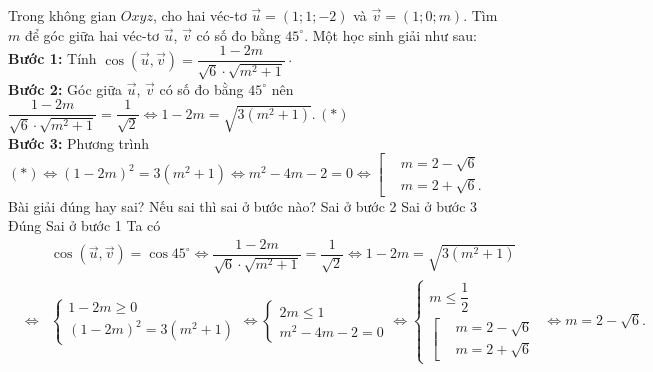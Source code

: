 \begin{ex}%
 Trong không gian $Oxyz$, cho hai véc-tơ $\vec{u}=(1;1;-2)$ và $\vec{v}=(1;0;m)$. Tìm $m$ để góc giữa hai véc-tơ $\vec{u}$, $\vec{v}$ có số đo bằng $45^\circ$. Một học sinh giải như sau:\\
 \textbf{Bước 1:} Tính $\cos\left(\vec{u},\vec{v}\right)=\dfrac{1-2m}{\sqrt{6}\cdot\sqrt{m^2+1}}\cdot$\\
 \textbf{Bước 2:} Góc giữa $\vec{u}$, $\vec{v}$ có số đo bằng $45^\circ$ nên $\dfrac{1-2m}{\sqrt{6}\cdot\sqrt{m^2+1}}=\dfrac{1}{\sqrt{2}} \Leftrightarrow 1-2m=\sqrt{3(m^2+1)}.\, (*)$\\
 \textbf{Bước 3:} Phương trình $(*) \Leftrightarrow (1-2m)^2=3(m^2+1) \Leftrightarrow m^2-4m-2=0 \Leftrightarrow \left[\begin{aligned} & m=2-\sqrt{6} \\& m=2+\sqrt{6}.\end{aligned}\right.$\\
 Bài giải đúng hay sai? Nếu sai thì sai ở bước nào?
 \choice
  {Sai ở bước 2}
  {\True Sai ở bước 3}
  {Đúng}
  {Sai ở bước 1}
 \loigiai
  {
  Ta có
  \begin{eqnarray*}
   & & \cos\left(\vec{u},\vec{v}\right)= \cos 45^\circ \Leftrightarrow \dfrac{1-2m}{\sqrt{6}\cdot\sqrt{m^2+1}}=\dfrac{1}{\sqrt{2}} \Leftrightarrow 1-2m=\sqrt{3(m^2+1)}\\
   &\Leftrightarrow & \begin{cases} 1-2m \geq 0 \\ (1-2m)^2 = 3(m^2+1) \end{cases} \Leftrightarrow \begin{cases} 2m \leq 1 \\ m^2 - 4m - 2 = 0 \end{cases} \Leftrightarrow \begin{cases} m \leq \dfrac{1}{2} \\ \left[\begin{aligned}& m = 2-\sqrt{6} \\& m = 2+\sqrt{6}\end{aligned}\right. \end{cases} \Leftrightarrow m = 2-\sqrt{6}.
  \end{eqnarray*}
  }
\end{ex}



